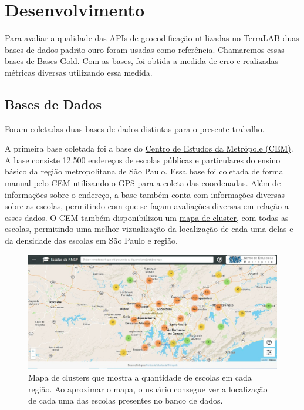 \chapter{Desenvolvimento} \label{desenvolvimento}


Para avaliar a qualidade das APIs de geocodificação utilizadas no TerraLAB duas bases de dados padrão ouro foram usadas como referência. Chamaremos essas bases de Bases Gold. Com as bases, foi obtida a medida de erro e realizadas métricas diversas utilizando essa medida.

\section{Bases de Dados}
Foram coletadas duas bases de dados distintas para o presente trabalho.

A primeira base coletada foi a base do \href{https://centrodametropole.fflch.usp.br/pt-br}{Centro de Estudos da Metrópole (CEM)}. A base consiste 12.500 endereços de escolas públicas e particulares do ensino básico da região metropolitana de São Paulo. Essa base foi coletada de forma manual pelo CEM utilizando o GPS para a coleta das coordenadas. Além de informações sobre o endereço, a base também conta com informações diversas sobre as escolas, permitindo com que se façam avaliações diversas em relação a esses dados. O CEM também disponibilizou um \href{http://200.144.244.241:3002/geolocation}{mapa de cluster}, com todas as escolas, permitindo uma melhor vizualização da localização de cada uma delas e da densidade das escolas em São Paulo e região.

\begin{figure}
    \centering
    \includegraphics[width=\textwidth]{Figuras/siteCEM.jpeg}
    \caption{Mapa de clusters que mostra a quantidade de escolas em cada região. Ao aproximar o mapa, o usuário consegue ver a localização de cada uma das escolas presentes no banco de dados.}
    \label{fig:siteCEM}
\end{figure}

